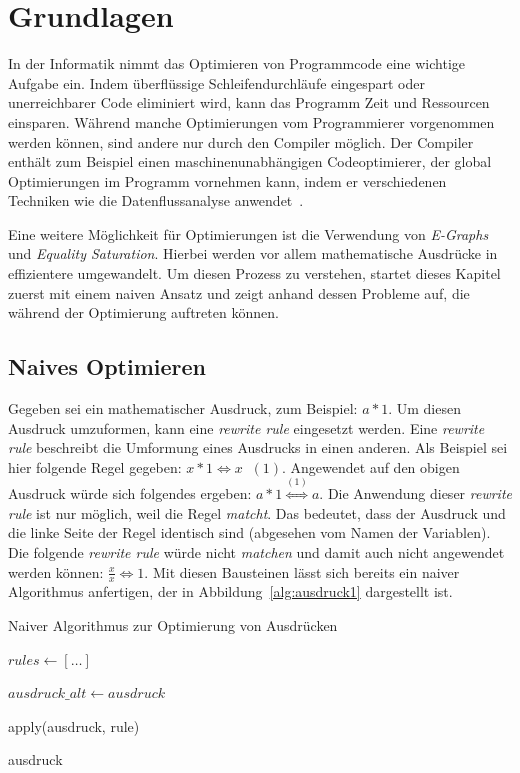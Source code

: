 \section{Grundlagen}\label{sec:grundlagen}

In der Informatik nimmt das Optimieren von Programmcode eine wichtige Aufgabe ein.
Indem überflüssige Schleifendurchläufe eingespart oder unerreichbarer Code eliminiert wird,
kann das Programm Zeit und Ressourcen einsparen. 
Während manche Optimierungen vom Programmierer vorgenommen werden können, sind andere nur 
durch den Compiler möglich.
Der Compiler enthält zum Beispiel einen maschinenunabhängigen Codeoptimierer, der global Optimierungen
im Programm vornehmen kann, indem er verschiedenen Techniken wie die Datenflussanalyse anwendet~\cite{ullman2008}.

\noindent Eine weitere Möglichkeit für Optimierungen ist die Verwendung von \textit{E-Graphs} und \textit{Equality Saturation}.
Hierbei werden vor allem mathematische Ausdrücke in effizientere umgewandelt.
Um diesen Prozess zu verstehen, startet dieses Kapitel zuerst mit einem naiven Ansatz und zeigt anhand dessen Probleme auf, die
während der Optimierung auftreten können.

\subsection{Naives Optimieren}

Gegeben sei ein mathematischer Ausdruck, zum Beispiel: $a * 1$. Um diesen Ausdruck umzuformen, kann eine \textit{rewrite rule} eingesetzt werden.
Eine \textit{rewrite rule} beschreibt die Umformung eines Ausdrucks in einen anderen. Als Beispiel sei hier folgende Regel gegeben: $x * 1 \Leftrightarrow x \;\; (1)$.
Angewendet auf den obigen Ausdruck würde sich folgendes ergeben: $a * 1  \overset{(1)}{\Leftrightarrow} a$.
Die Anwendung dieser \textit{rewrite rule} ist nur möglich, weil die Regel \textit{matcht}. Das bedeutet, dass der Ausdruck und die linke Seite der Regel identisch sind 
(abgesehen vom Namen der Variablen). Die folgende \textit{rewrite rule} würde nicht \textit{matchen} und damit auch nicht angewendet werden können: $\frac{x}{x} \Leftrightarrow 1$.
Mit diesen Bausteinen lässt sich bereits ein naiver Algorithmus anfertigen, der in Abbildung~\ref{alg:ausdruck1} dargestellt ist.

\begin{algorithm}[H]
  \caption{Naiver Algorithmus zur Optimierung von Ausdrücken}\label{alg:ausdruck1}
  \begin{algorithmic}
    \State $rules \gets [\ldots]$
    
      \State $ausdruck\_alt \gets ausdruck$

        \State apply(ausdruck, rule)
        \EndIf
      \EndFor
    \EndWhile

    \State \Return ausdruck
    \EndFunction
  \end{algorithmic}
\end{algorithm}

